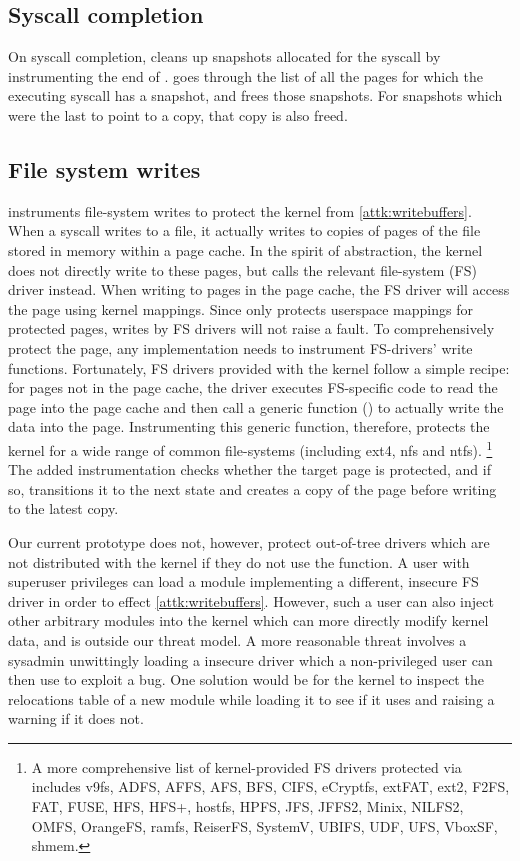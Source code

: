 \documentclass[letterpaper,twocolumn,10pt, anonymous]{article}
\begin{document}
\subsection{Syscall completion}
On syscall completion, \tiktok cleans up snapshots allocated for 
the syscall by instrumenting the end of .
\tiktok goes through the list of all the pages for which the 
executing syscall has a snapshot, and frees those snapshots.
For snapshots which were the last to point to a copy, that 
copy is also freed.

\subsection{File system writes}

\tiktok instruments file-system writes to protect the kernel
from \autoref{attk:writebuffers}.
When a  syscall writes to a file, it actually
writes to copies of pages of the file stored in memory within 
a page cache.
In the spirit of abstraction, the kernel does not directly write to 
these pages, but calls the relevant file-system (FS) driver instead.
When writing to pages in the page cache, the FS driver will access the 
page using kernel mappings.
Since \tiktok only protects userspace mappings for protected pages, 
writes by FS drivers will not raise a fault.
To comprehensively protect the page, any implementation needs to 
instrument FS-drivers' write functions.
Fortunately, FS drivers provided with the kernel follow a simple 
recipe: for pages not in the page cache, the driver executes 
FS-specific code to read the page into the page cache and then 
call a generic function () to actually 
write the data into the page.
Instrumenting this generic function, therefore, protects the kernel
for a wide range of common file-systems (including ext4, nfs and 
ntfs). \footnote{A more comprehensive list of kernel-provided FS drivers 
protected via  includes v9fs, ADFS, AFFS, 
AFS, BFS, CIFS, eCryptfs, extFAT, ext2, F2FS,  FAT, FUSE, HFS, HFS+, 
hostfs, HPFS, JFS, JFFS2, Minix, NILFS2, OMFS, OrangeFS, ramfs, ReiserFS,
SystemV, UBIFS, UDF, UFS, VboxSF, shmem.}
The added instrumentation checks whether the target page is 
protected, and if so, transitions it to the next state and 
creates a copy of the page before writing to the latest copy.

Our current prototype does not, however, protect out-of-tree drivers
which are not distributed with the kernel if they do not use the 
 function.
A user with superuser privileges can load a module implementing a 
different, insecure FS driver in order to effect \autoref{attk:writebuffers}.
However, such a user can also inject other arbitrary modules into 
the kernel which can more directly modify kernel data, and is 
outside our threat model.
A more reasonable threat involves a sysadmin unwittingly loading a 
insecure driver which a non-privileged user can then use to 
exploit a \tocttou bug. 
One solution would be for the kernel to inspect the relocations table of 
a new module while loading it to see if it uses 
and raising a warning if it does not.
\end{document}
